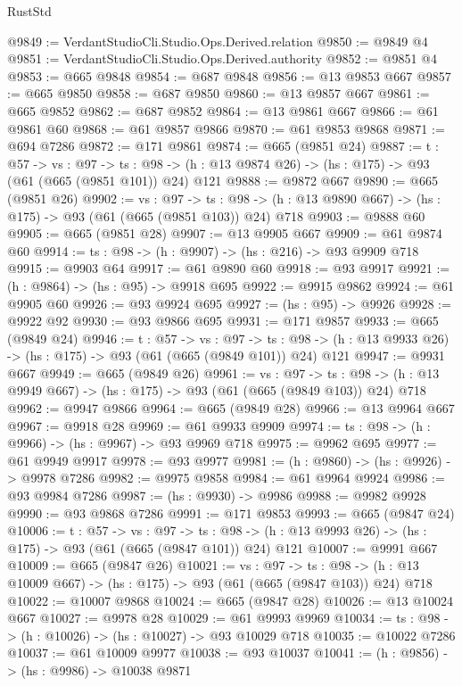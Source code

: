 \begin{lexlean}{RustStd}
\begin{coremodule}
@9849 := VerdantStudioCli.Studio.Ops.Derived.relation
@9850 := @9849 @4
@9851 := VerdantStudioCli.Studio.Ops.Derived.authority
@9852 := @9851 @4
@9853 := @665 @9848
@9854 := @687 @9848
@9856 := @13 @9853 @667
@9857 := @665 @9850
@9858 := @687 @9850
@9860 := @13 @9857 @667
@9861 := @665 @9852
@9862 := @687 @9852
@9864 := @13 @9861 @667
@9866 := @61 @9861 @60
@9868 := @61 @9857 @9866
@9870 := @61 @9853 @9868
@9871 := @694 @7286
@9872 := @171 @9861
@9874 := @665 (@9851 @24)
@9887 := {t : @57} ->
  {vs : @97} ->
  {ts : @98} -> (h : @13 @9874 @26) -> (hs : @175) -> @93 (@61 (@665 (@9851 @101)) @24) @121
@9888 := @9872 @667
@9890 := @665 (@9851 @26)
@9902 := {vs : @97} ->
  {ts : @98} -> (h : @13 @9890 @667) -> (hs : @175) -> @93 (@61 (@665 (@9851 @103)) @24) @718
@9903 := @9888 @60
@9905 := @665 (@9851 @28)
@9907 := @13 @9905 @667
@9909 := @61 @9874 @60
@9914 := {ts : @98} -> (h : @9907) -> (hs : @216) -> @93 @9909 @718
@9915 := @9903 @64
@9917 := @61 @9890 @60
@9918 := @93 @9917
@9921 := (h : @9864) -> (hs : @95) -> @9918 @695
@9922 := @9915 @9862
@9924 := @61 @9905 @60
@9926 := @93 @9924 @695
@9927 := (hs : @95) -> @9926
@9928 := @9922 @92
@9930 := @93 @9866 @695
@9931 := @171 @9857
@9933 := @665 (@9849 @24)
@9946 := {t : @57} ->
  {vs : @97} ->
  {ts : @98} -> (h : @13 @9933 @26) -> (hs : @175) -> @93 (@61 (@665 (@9849 @101)) @24) @121
@9947 := @9931 @667
@9949 := @665 (@9849 @26)
@9961 := {vs : @97} ->
  {ts : @98} -> (h : @13 @9949 @667) -> (hs : @175) -> @93 (@61 (@665 (@9849 @103)) @24) @718
@9962 := @9947 @9866
@9964 := @665 (@9849 @28)
@9966 := @13 @9964 @667
@9967 := @9918 @28
@9969 := @61 @9933 @9909
@9974 := {ts : @98} -> (h : @9966) -> (hs : @9967) -> @93 @9969 @718
@9975 := @9962 @695
@9977 := @61 @9949 @9917
@9978 := @93 @9977
@9981 := (h : @9860) -> (hs : @9926) -> @9978 @7286
@9982 := @9975 @9858
@9984 := @61 @9964 @9924
@9986 := @93 @9984 @7286
@9987 := (hs : @9930) -> @9986
@9988 := @9982 @9928
@9990 := @93 @9868 @7286
@9991 := @171 @9853
@9993 := @665 (@9847 @24)
@10006 := {t : @57} ->
  {vs : @97} ->
  {ts : @98} -> (h : @13 @9993 @26) -> (hs : @175) -> @93 (@61 (@665 (@9847 @101)) @24) @121
@10007 := @9991 @667
@10009 := @665 (@9847 @26)
@10021 := {vs : @97} ->
  {ts : @98} -> (h : @13 @10009 @667) -> (hs : @175) -> @93 (@61 (@665 (@9847 @103)) @24) @718
@10022 := @10007 @9868
@10024 := @665 (@9847 @28)
@10026 := @13 @10024 @667
@10027 := @9978 @28
@10029 := @61 @9993 @9969
@10034 := {ts : @98} -> (h : @10026) -> (hs : @10027) -> @93 @10029 @718
@10035 := @10022 @7286
@10037 := @61 @10009 @9977
@10038 := @93 @10037
@10041 := (h : @9856) -> (hs : @9986) -> @10038 @9871

\end{coremodule}
\end{lexlean}
